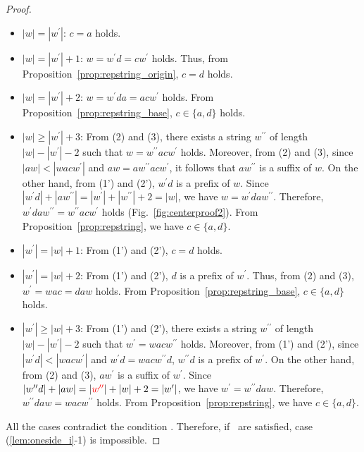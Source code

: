 \begin{proof}
  \begin{itemize}
  \item $|w|=|w^{\prime}|$: $c = a$ holds.
  \item $|w|=|w^{\prime}|+1$: $w = w^{\prime}d = cw^{\prime}$ holds. Thus, from Proposition~\ref{prop:repstring_origin}, $c = d$ holds.
  \item $|w| = |w^{\prime}|+2$: $w = w^{\prime}da = acw^{\prime}$ holds. From Proposition~\ref{prop:repstring_base},  $c \in \{a, d\}$ holds.
  \item $|w| \ge |w^{\prime}|+3$: From (2) and (3), there exists a string $w^{\prime\prime}$ of length $|w|-|w^{\prime}|-2$ such that $w=w^{\prime\prime}acw^{\prime}$ holds.
  Moreover, from (2) and (3), since $|aw| < |wacw^{\prime}|$ and $aw = aw^{\prime\prime}acw^{\prime}$, it follows that $aw^{\prime\prime}$ is a suffix of $w$.
  On the other hand, from (1') and (2'), $w^{\prime}d$ is a prefix of $w$.
  Since $|w^{\prime}d| + |aw^{\prime\prime}| = |w^{\prime}| + |w^{\prime\prime}| + 2 = |w|$, we have $w=w^{\prime}daw^{\prime\prime}$.
  Therefore, $w^{\prime}daw^{\prime\prime} = w^{\prime\prime}acw^{\prime}$ holds (Fig.~\ref{fig:centerproof2}).
  From Proposition~\ref{prop:repstring}, we have $c \in \{a, d\}$.
  \item $|w^{\prime}|=|w|+1$: From (1') and (2'), $c = d$ holds.
  \item $|w^{\prime}| = |w|+2$: From (1') and (2'), $d$ is a prefix of $w^{\prime}$. Thus, from (2) and (3), $w^{\prime} = wac = daw$ holds. From Proposition~\ref{prop:repstring_base}, $c \in \{a, d\}$ holds.
 \item $|w^{\prime}| \ge |w|+3$: From (1') and (2'), there exists a string $w^{\prime\prime}$ of length $|w|-|w^{\prime}|-2$ such that $w^{\prime}=wacw^{\prime\prime}$ holds.
  Moreover, from (1') and (2'), since $|w^{\prime}d| < |wacw^{\prime}|$ and $w^{\prime}d = wacw^{\prime\prime}d$, {\color{red} $w^{\prime\prime}d$} is a prefix of $w^{\prime}$.
  On the other hand, from {\color{red} (2) and (3)}, {\color{red} $aw^{\prime}$} is a suffix of $w^{\prime}$.
  Since $|w^{\prime\prime}d| + |aw| = |{\color{red} w^{\prime\prime}}| + |w| + 2 = |w^{\prime}|$, we have $w^{\prime}=w^{\prime\prime}daw$.
  Therefore, $w^{\prime\prime}daw = wacw^{\prime\prime}$ holds.
  From Proposition~\ref{prop:repstring}, we have $c \in \{a, d\}$.
  \end{itemize}
  All the cases contradict the condition \TheConditionBsub.
  Therefore, if \TheConditionB\ are satisfied, case (\ref{lem:oneside_i}-1) is impossible.


\end{proof}
